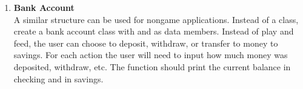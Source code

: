 \begin{enumerate}
\item {\bf Bank Account}\\ 
A similar structure can be used for nongame applications.  Instead of a  class, create a bank account class with  and  as data members.  Instead of play and feed, the user can choose to deposit, withdraw, or transfer to money to savings.  For each action the user will need to input how much money was deposited, withdraw, etc.  The  function should print the current balance in checking and in savings.


\end{enumerate}



